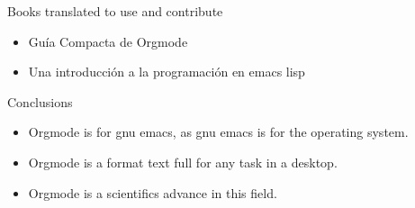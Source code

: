 \documentclass[bigger]{beamer}
\begin{document}
\begin{frame}[label=sec-9]{Books translated to use and contribute}
\begin{itemize}
\item Guía Compacta de Orgmode
\item Una introducción a la programación en emacs lisp
\end{itemize}
\end{frame}

\begin{frame}[label=sec-10]{Conclusions}
\begin{itemize}
\item Orgmode is for gnu emacs, as gnu emacs is for the operating system.
\item Orgmode is a format text full for any task in a desktop.
\item Orgmode is a scientifics advance in this field.
\end{itemize}
\end{frame}
\end{document}
